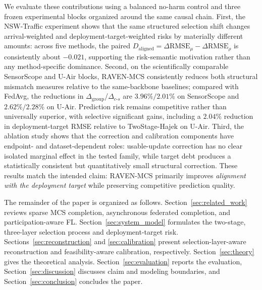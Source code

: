 \documentclass[letterpaper,journal]{IEEEtran}
\begin{document}
We evaluate these contributions using a balanced no-harm control and three
frozen experimental blocks organized around the same causal chain.  First, the
NSW-Traffic experiment shows that the same structured selection shift changes
arrival-weighted and deployment-target-weighted risks by materially different
amounts: across five methods, the paired
$D_{\mathrm{aligned}}=\Delta\mathrm{RMSE}_{\mu}
-\Delta\mathrm{RMSE}_{\rho}$ is consistently about $-0.021$, supporting the
risk-semantic motivation rather than any method-specific dominance.  Second,
on the scientifically comparable SensorScope and U-Air blocks, RAVEN-MCS
consistently reduces both structural mismatch measures relative to the
same-backbone baselines; compared with FedAvg, the reductions in
$\Delta_{\mathrm{group}}$/$\Delta_{c\text{-}s}$ are
$3.96\%/2.01\%$ on SensorScope and $2.62\%/2.28\%$ on U-Air.
Prediction risk remains competitive rather than universally superior, with
selective significant gains, including a $2.04\%$ reduction in
deployment-target RMSE relative to TwoStage-Hajek on U-Air.  Third, the
ablation study shows that the correction and calibration components have
endpoint- and dataset-dependent roles: usable-update correction has no clear
isolated marginal effect in the tested family, while target debt produces a
statistically consistent but quantitatively small structural correction.
These results match the intended claim: RAVEN-MCS primarily improves
\emph{alignment with the deployment target} while preserving competitive
prediction quality.

The remainder of the paper is organized as follows.
Section~\ref{sec:related_work} reviews sparse MCS completion, asynchronous
federated completion, and participation-aware FL.
Section~\ref{sec:system_model} formulates the two-stage, three-layer selection
process and deployment-target risk.
Sections~\ref{sec:reconstruction} and \ref{sec:calibration} present
selection-layer-aware reconstruction and feasibility-aware calibration,
respectively.
Section~\ref{sec:theory} gives the theoretical analysis.
Section~\ref{sec:evaluation} reports the evaluation,
Section~\ref{sec:discussion} discusses claim and modeling boundaries, and
Section~\ref{sec:conclusion} concludes the paper.

%
%
\end{document}
